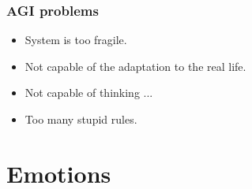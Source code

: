 \documentclass[12pt, aspectratio=169]{beamer}
\begin{document}

\begin{frame}
  \frametitle{AGI problems}
  \begin{itemize}
    \item System is too fragile.
    \item Not capable of the adaptation to the real life.
    \item Not capable of thinking ...
    \item Too many stupid rules.
  \end{itemize}
\end{frame}

\section{Emotions}
\end{document}
